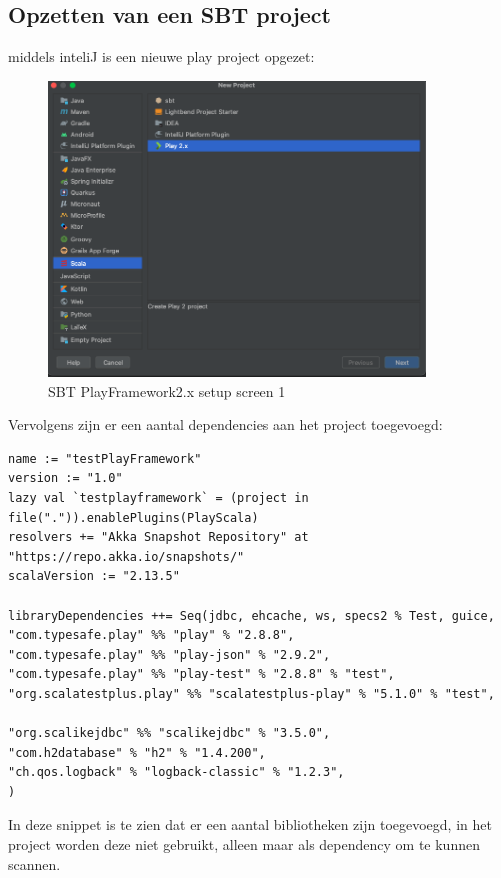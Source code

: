 \subsection{Opzetten van een SBT project}\label{subsec:opzetten-van-een-project}
middels inteliJ is een nieuwe play project opgezet:
\begin{figure}[H]
    \centering
    \includegraphics[width=10cm]{gfx/sbtplaysetup}
    \caption{SBT PlayFramework2.x setup screen 1}
    \label{fig:sbtplaysetupscreen1}
\end{figure}
Vervolgens zijn er een aantal dependencies aan het project toegevoegd:
\begin{lstlisting}[caption={build.sbt},label=lst:build.sbt]
name := "testPlayFramework"
version := "1.0"
lazy val `testplayframework` = (project in file(".")).enablePlugins(PlayScala)
resolvers += "Akka Snapshot Repository" at "https://repo.akka.io/snapshots/"
scalaVersion := "2.13.5"

libraryDependencies ++= Seq(jdbc, ehcache, ws, specs2 % Test, guice,
"com.typesafe.play" %% "play" % "2.8.8",
"com.typesafe.play" %% "play-json" % "2.9.2",
"com.typesafe.play" %% "play-test" % "2.8.8" % "test",
"org.scalatestplus.play" %% "scalatestplus-play" % "5.1.0" % "test",

"org.scalikejdbc" %% "scalikejdbc" % "3.5.0",
"com.h2database" % "h2" % "1.4.200",
"ch.qos.logback" % "logback-classic" % "1.2.3",
)

\end{lstlisting}
In deze snippet is te zien dat er een aantal bibliotheken zijn toegevoegd, in het project worden deze niet gebruikt, alleen maar als dependency om te kunnen scannen.


